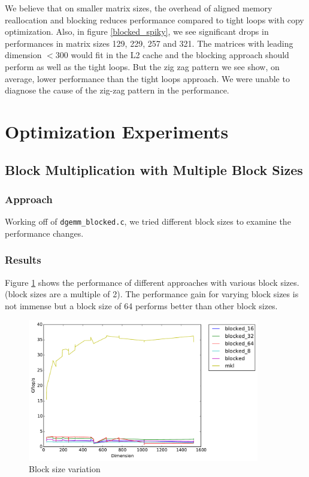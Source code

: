 \documentclass[11pt]{article}
\begin{document}
We believe that on smaller matrix sizes, the overhead of aligned memory reallocation and blocking reduces performance compared to tight loops with copy optimization. Also, in figure \ref{blocked_spiky}, we see significant drops in performances in matrix sizes 129, 229, 257 and 321. The matrices with leading dimension $< 300$ would fit in the L2 cache and the blocking approach should perform as well as the tight loops. But the zig zag pattern we see  show, on average, lower performance than the tight loops approach.  We were unable to diagnose the cause of the zig-zag pattern in the performance. 

\section{Optimization Experiments}
\subsection{Block Multiplication with Multiple Block Sizes} \label{sec:prev_block}
\subsubsection{Approach}
Working off of \texttt{dgemm\_blocked.c}, we tried different block sizes to examine the performance changes. 
\subsubsection{Results}
Figure \ref{pow_2_blocks} shows the performance of different approaches with various block sizes. (block sizes are a multiple of 2). The performance gain for varying block sizes is not immense but a block size of 64 performs better than other block sizes. \\

\begin{figure}[H]
    \includegraphics[width=0.9\textwidth]{timing_block_size_changes.pdf}
    \caption{Block size variation}
    \label{pow_2_blocks}
\end{figure} 
\end{document}
